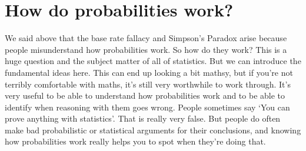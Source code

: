 \section{How do probabilities work?}

We said above that the base rate fallacy and Simpson's Paradox arise because people misunderstand how probabilities work. So how do they work? This is a huge question and the subject matter of all of statistics. But we can introduce the fundamental ideas here. This can end up looking a bit mathsy, but if you're not terribly comfortable with maths, it's still very worthwhile to work through. It's very useful to be able to understand how probabilities work and to be able to identify when reasoning with them goes wrong. People sometimes say `You can prove anything with statistics'. That is really very false. But people do often make bad probabilistic or statistical arguments for their conclusions, and knowing how probabilities work really helps you to spot when they're doing that.

